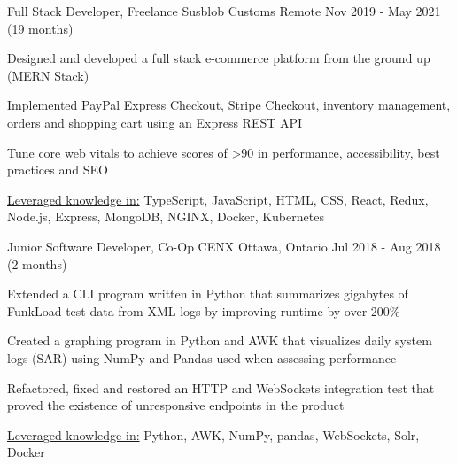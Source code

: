 \begin{cventries}
{\begin{cvitems}
		\end{cvitems}
	}
	\cventry
	{Full Stack Developer, Freelance}
	{Susblob Customs}
	{Remote}
	{Nov 2019 - May 2021 (19 months)}
	{
		\begin{cvitems}
			\item{Designed and developed a full stack e-commerce platform from the ground up (MERN Stack)}
			\item{Implemented PayPal Express Checkout, Stripe Checkout, inventory management, orders and shopping cart using an Express REST API}
			\item{Tune core web vitals to achieve scores of >90 in performance, accessibility, best practices and SEO}
			\item{\underline{Leveraged knowledge in:} TypeScript, JavaScript, HTML, CSS, React, Redux, Node.js, Express, MongoDB, NGINX, Docker, Kubernetes}
		\end{cvitems}
	}
	\cventry
	{Junior Software Developer, Co-Op}
	{CENX}
	{Ottawa, Ontario}
	{Jul 2018 - Aug 2018 (2 months)}
	{
		\begin{cvitems}
			\item{Extended a CLI program written in Python that summarizes gigabytes of FunkLoad test data from XML logs by improving runtime by over 200\%}
			\item{Created a graphing program in Python and AWK that visualizes daily system logs (SAR) using NumPy and Pandas used when assessing performance}
			\item{Refactored, fixed and restored an HTTP and WebSockets integration test that proved the existence of unresponsive endpoints in the product}
			\item{\underline{Leveraged knowledge in:} Python, AWK, NumPy, pandas, WebSockets, Solr, Docker}
		\end{cvitems}
	}
\end{cventries}
